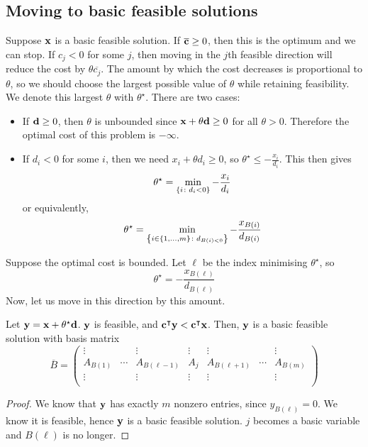 \subsection{Moving to basic feasible solutions}
Suppose \( \vb x \) is a basic feasible solution.
If \( \overline{\vb c} \geq 0 \), then this is the optimum and we can stop.
If \( c_j < 0 \) for some \( j \), then moving in the \( j \)th feasible direction will reduce the cost by \( \theta \overline{c_j} \).
The amount by which the cost decreases is proportional to \( \theta \), so we should choose the largest possible value of \( \theta \) while retaining feasibility.
We denote this largest \( \theta \) with \( \theta^\star \).
There are two cases:
\begin{itemize}
	\item If \( \vb d \geq 0 \), then \( \theta \) is unbounded since \( \vb x + \theta \vb d \geq 0 \) for all \( \theta > 0 \).
	      Therefore the optimal cost of this problem is \( -\infty \).
	\item If \( d_i < 0 \) for some \( i \), then we need \( x_i + \theta d_i \geq 0 \), so \( \theta^\star \leq -\frac{x_i}{d_i} \).
	      This then gives
	      \[
		      \theta^\star = \min_{\qty{i \colon d_i < 0}} -\frac{x_i}{d_i}
	      \]
	      or equivalently,
	      \[
		      \theta^\star = \min_{\qty{i \in \qty{1,\dots,m} \colon d_{B(i) < 0}}} -\frac{x_{B(i)}}{d_{B(i)}}
	      \]
\end{itemize}
Suppose the optimal cost is bounded.
Let \( \ell \) be the index minimising \( \theta^\star \), so
\[
	\theta^\star = -\frac{x_{B(\ell)}}{d_{B(\ell)}}
\]
Now, let us move in this direction by this amount.
\begin{theorem}
	Let \( \vb y = \vb x + \theta^\star \vb d \).
	\( \vb y \) is feasible, and \( \vb c^\intercal \vb y < \vb c^\intercal \vb x \).
	Then, \( \vb y \) is a basic feasible solution with basis matrix
	\[
		\overline{B} = \begin{pmatrix}
			\vdots   &        & \vdots        & \vdots & \vdots        &        & \vdots   \\
			A_{B(1)} & \cdots & A_{B(\ell-1)} & A_{j}  & A_{B(\ell+1)} & \cdots & A_{B(m)} \\
			\vdots   &        & \vdots        & \vdots & \vdots        &        & \vdots   \\
		\end{pmatrix}
	\]
\end{theorem}
\begin{proof}
	We know that \( \vb y \) has exactly \( m \) nonzero entries, since \( y_{B(\ell)} = 0 \).
	We know it is feasible, hence \( \vb y \) is a basic feasible solution.
	\( j \) becomes a basic variable and \( B(\ell) \) is no longer.
\end{proof}

